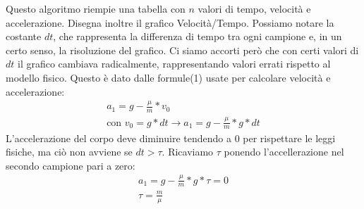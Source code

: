 \documentclass[11pt]{article} %
\begin{document}
Questo algoritmo riempie una tabella con $n$ valori di tempo, velocità e accelerazione. Disegna inoltre il grafico Velocità/Tempo. Possiamo notare la costante $dt$, che rappresenta la differenza di tempo tra ogni campione e, in un certo senso, la risoluzione del grafico. Ci siamo accorti però che con certi valori di $dt$ il grafico cambiava radicalmente, rappresentando valori errati rispetto al modello fisico. Questo è dato dalle formule(1) usate per calcolare velocità e accelerazione:
\begin{equation}\begin{split}a_{1}=g-\frac{\mu}{m}*v_{0}\\
\text{con }v_{0}=g*dt \rightarrow a_{1}=g-\frac{\mu}{m}*g*dt\end{split}\end{equation}
L'accelerazione del corpo deve diminuire tendendo a 0 per rispettare le leggi fisiche, ma ciò non avviene se $dt > \tau$. Ricaviamo $\tau$ ponendo l'accellerazione nel secondo campione pari a zero:
\begin{equation}\begin{split} a_{1}=g-\frac{\mu}{m}*g*\tau=0\\ \tau = \frac{m}{\mu}\end{split}\end{equation}
\end{document}
